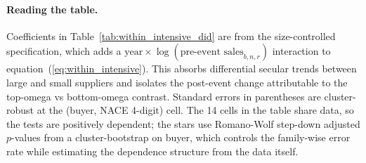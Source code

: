 \begin{table}[H]
    \centering
    \caption{Reallocation Within Sectors}
    \label{tab:within_intensive_did}
    
\end{table}

\paragraph{Reading the table.} Coefficients in Table~\ref{tab:within_intensive_did} are from the size-controlled specification, which adds a $\text{year} \times \log(\text{pre-event sales}_{b,n,r})$ interaction to equation~(\ref{eq:within_intensive}). This absorbs differential secular trends between large and small suppliers and isolates the post-event change attributable to the top-omega vs bottom-omega contrast. Standard errors in parentheses are cluster-robust at the (buyer, NACE 4-digit) cell. The 14 cells in the table share data, so the tests are positively dependent; the stars use Romano-Wolf step-down adjusted $p$-values from a cluster-bootstrap on buyer, which controls the family-wise error rate while estimating the dependence structure from the data itself. 

